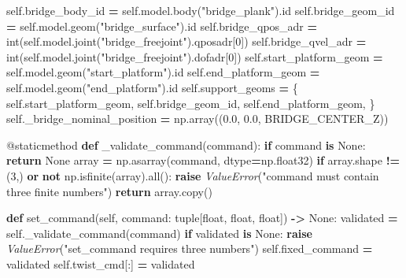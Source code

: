 \documentclass[
  american,
  11pt,
  letterpaper,
]{article}
\newenvironment{Shaded}{\begin{snugshade}}{\end{snugshade}}
\newcommand{\AttributeTok}[1]{\textcolor[rgb]{0.13,0.29,0.53}{#1}}
\newcommand{\BuiltInTok}[1]{#1}
\newcommand{\ControlFlowTok}[1]{\textcolor[rgb]{0.13,0.29,0.53}{\textbf{#1}}}
\newcommand{\DecValTok}[1]{\textcolor[rgb]{0.00,0.00,0.81}{#1}}
\newcommand{\FloatTok}[1]{\textcolor[rgb]{0.00,0.00,0.81}{#1}}
\newcommand{\KeywordTok}[1]{\textcolor[rgb]{0.13,0.29,0.53}{\textbf{#1}}}
\newcommand{\NormalTok}[1]{#1}
\newcommand{\OperatorTok}[1]{\textcolor[rgb]{0.81,0.36,0.00}{\textbf{#1}}}
\newcommand{\PreprocessorTok}[1]{\textcolor[rgb]{0.56,0.35,0.01}{\textit{#1}}}
\newcommand{\StringTok}[1]{\textcolor[rgb]{0.31,0.60,0.02}{#1}}
\newcommand{\VariableTok}[1]{\textcolor[rgb]{0.00,0.00,0.00}{#1}}
\renewenvironment{Shaded}{\par\smallskip}{\par\smallskip}
\begin{document}
\begin{Shaded}
\begin{Highlighting}[]
        \VariableTok{self}\NormalTok{.bridge\_body\_id }\OperatorTok{=} \VariableTok{self}\NormalTok{.model.body(}\StringTok{"bridge\_plank"}\NormalTok{).}\BuiltInTok{id}
        \VariableTok{self}\NormalTok{.bridge\_geom\_id }\OperatorTok{=} \VariableTok{self}\NormalTok{.model.geom(}\StringTok{"bridge\_surface"}\NormalTok{).}\BuiltInTok{id}
        \VariableTok{self}\NormalTok{.bridge\_qpos\_adr }\OperatorTok{=} \BuiltInTok{int}\NormalTok{(}\VariableTok{self}\NormalTok{.model.joint(}\StringTok{"bridge\_freejoint"}\NormalTok{).qposadr[}\DecValTok{0}\NormalTok{])}
        \VariableTok{self}\NormalTok{.bridge\_qvel\_adr }\OperatorTok{=} \BuiltInTok{int}\NormalTok{(}\VariableTok{self}\NormalTok{.model.joint(}\StringTok{"bridge\_freejoint"}\NormalTok{).dofadr[}\DecValTok{0}\NormalTok{])}
        \VariableTok{self}\NormalTok{.start\_platform\_geom }\OperatorTok{=} \VariableTok{self}\NormalTok{.model.geom(}\StringTok{"start\_platform"}\NormalTok{).}\BuiltInTok{id}
        \VariableTok{self}\NormalTok{.end\_platform\_geom }\OperatorTok{=} \VariableTok{self}\NormalTok{.model.geom(}\StringTok{"end\_platform"}\NormalTok{).}\BuiltInTok{id}
        \VariableTok{self}\NormalTok{.support\_geoms }\OperatorTok{=}\NormalTok{ \{}
            \VariableTok{self}\NormalTok{.start\_platform\_geom,}
            \VariableTok{self}\NormalTok{.bridge\_geom\_id,}
            \VariableTok{self}\NormalTok{.end\_platform\_geom,}
\NormalTok{        \}}
        \VariableTok{self}\NormalTok{.\_bridge\_nominal\_position }\OperatorTok{=}\NormalTok{ np.array((}\FloatTok{0.0}\NormalTok{, }\FloatTok{0.0}\NormalTok{, BRIDGE\_CENTER\_Z))}

    \AttributeTok{@staticmethod}
    \KeywordTok{def}\NormalTok{ \_validate\_command(command):}
        \ControlFlowTok{if}\NormalTok{ command }\KeywordTok{is} \VariableTok{None}\NormalTok{:}
            \ControlFlowTok{return} \VariableTok{None}
\NormalTok{        array }\OperatorTok{=}\NormalTok{ np.asarray(command, dtype}\OperatorTok{=}\NormalTok{np.float32)}
        \ControlFlowTok{if}\NormalTok{ array.shape }\OperatorTok{!=}\NormalTok{ (}\DecValTok{3}\NormalTok{,) }\KeywordTok{or} \KeywordTok{not}\NormalTok{ np.isfinite(array).}\BuiltInTok{all}\NormalTok{():}
            \ControlFlowTok{raise} \PreprocessorTok{ValueError}\NormalTok{(}\StringTok{"command must contain three finite numbers"}\NormalTok{)}
        \ControlFlowTok{return}\NormalTok{ array.copy()}

    \KeywordTok{def}\NormalTok{ set\_command(}\VariableTok{self}\NormalTok{, command: }\BuiltInTok{tuple}\NormalTok{[}\BuiltInTok{float}\NormalTok{, }\BuiltInTok{float}\NormalTok{, }\BuiltInTok{float}\NormalTok{]) }\OperatorTok{{-}\textgreater{}} \VariableTok{None}\NormalTok{:}
\NormalTok{        validated }\OperatorTok{=} \VariableTok{self}\NormalTok{.\_validate\_command(command)}
        \ControlFlowTok{if}\NormalTok{ validated }\KeywordTok{is} \VariableTok{None}\NormalTok{:}
            \ControlFlowTok{raise} \PreprocessorTok{ValueError}\NormalTok{(}\StringTok{"set\_command requires three numbers"}\NormalTok{)}
        \VariableTok{self}\NormalTok{.fixed\_command }\OperatorTok{=}\NormalTok{ validated}
        \VariableTok{self}\NormalTok{.twist\_cmd[:] }\OperatorTok{=}\NormalTok{ validated}


\end{Highlighting}
\end{Shaded}
\end{document}
